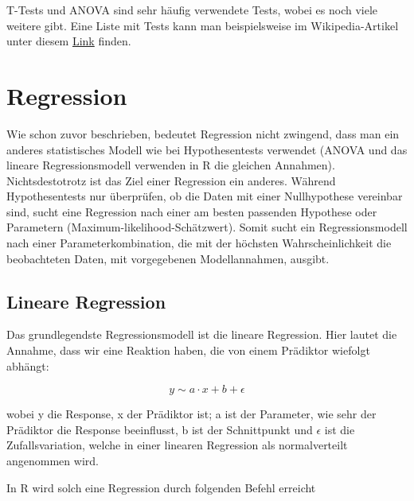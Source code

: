 \documentclass[a4paper,twoside]{tufte-book}\usepackage[]{graphicx}\usepackage[]{color}
\begin{document}
T-Tests und ANOVA sind sehr häufig verwendete Tests, wobei es noch viele weitere gibt. Eine Liste mit Tests kann man beispielsweise im Wikipedia-Artikel unter diesem \href{http://en.wikipedia.org/wiki/Category:Statistical_tests}{Link} finden.


\section{Regression}

Wie schon zuvor beschrieben, bedeutet Regression nicht zwingend, dass man ein anderes statistisches Modell wie bei Hypothesentests verwendet (ANOVA und das lineare Regressionsmodell verwenden in R die gleichen Annahmen). Nichtsdestotrotz ist das Ziel einer Regression ein anderes. Während Hypothesentests nur überprüfen, ob die Daten mit einer Nullhypothese vereinbar sind, sucht eine Regression nach einer am besten passenden Hypothese oder Parametern (Maximum-likelihood-Schätzwert). Somit sucht ein Regressionsmodell nach einer Parameterkombination, die mit der höchsten Wahrscheinlichkeit die beobachteten Daten, mit vorgegebenen Modellannahmen, ausgibt.

\subsection{Lineare Regression}

Das grundlegendste Regressionsmodell ist die lineare Regression. Hier lautet die Annahme, dass wir eine Reaktion haben, die von einem Prädiktor wiefolgt abhängt:

\begin{equation} \label{eq: linear regression}
y \sim a \cdot x + b + \epsilon 
\end{equation}

wobei y die Response, x der Prädiktor ist; a ist der Parameter, wie sehr der Prädiktor die Response beeinflusst, b ist der Schnittpunkt und $\epsilon$ ist die Zufallsvariation, welche in einer linearen Regression als normalverteilt angenommen wird.

In R wird solch eine Regression durch folgenden Befehl erreicht
\end{document}
